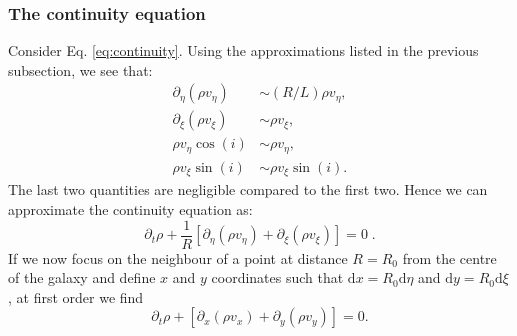 \documentclass[useAMS,usenatbib]{mn2e}
\def\pa{\partial}
\begin{document}
\subsubsection{The continuity equation}
%
Consider Eq. \eqref{eq:continuity}. Using the approximations listed in the previous subsection, we see that:
\begin{align}  
\pa_{\eta} \left(\rho v_{\eta}\right) & \sim (R/L) \rho v_{\eta}, \\ 
\pa_{\xi} \left(\rho v_{\xi}\right) &\sim \rho v_{\xi}, \\
\rho v_{\eta} \cos(i) &\sim \rho v_{\eta}, \\
 \rho v_{\xi} \sin(i) &\sim  \rho v_{\xi} \sin(i).
 \end{align}
 The last two quantities are negligible compared to the first two. Hence we can approximate the continuity equation as:
%
\begin{equation}
\pa_t \rho + \frac{1}{R}\left[ \pa_{\eta} \left(\rho v_{\eta}\right) + \pa_{\xi} \left(\rho v_{\xi}\right) \right] = 0 \;.
\end{equation}
%
If we now focus on the neighbour of a point at distance $R=R_0$ from the centre of the galaxy and define $x$ and $y$ coordinates such that $\text{d}x=R_0\text{d}\eta$ and $\text{d}y=R_0\text{d}\xi$, at first order we find
\begin{equation}
 \pa_t \rho + \left[ \pa_{x} \left(\rho v_{x}\right) + \pa_{y} \left(\rho v_{y}\right) \right] = 0. \label{eq:finalcontinuity}
\end{equation}
\end{document}
